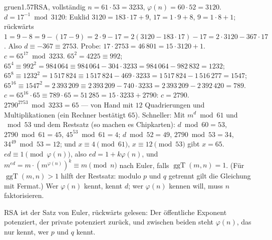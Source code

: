 \begin{loesungkarte}{gruen}{1.57}{RSA, vollständig}
$n = 61\cdot53 = 3233$, $\varphi(n) = 60\cdot52 = 3120$. $d = 17^{-1}\bmod3120$: Euklid $3120 = 183\cdot17 + 9$, $17 = 1\cdot9 + 8$, $9 = 1\cdot8 + 1$; rückwärts $1 = 9 - 8 = 9 - (17 - 9) = 2\cdot9 - 17 = 2(3120 - 183\cdot17) - 17 = 2\cdot3120 - 367\cdot17$. Also $d\equiv-367\equiv2753$. Probe: $17\cdot2753 = 46\,801 = 15\cdot3120 + 1$. \checkmark
{}
$c = 65^{17}\bmod3233$. $65^{2} = 4225\equiv992$; $65^{4}\equiv992^{2} = 984\,064\equiv984\,064 - 304\cdot3233 = 984\,064 - 982\,832 = 1232$; $65^{8}\equiv1232^{2} = 1\,517\,824\equiv1\,517\,824 - 469\cdot3233 = 1\,517\,824 - 1\,516\,277 = 1547$; $65^{16}\equiv1547^{2} = 2\,393\,209\equiv2\,393\,209 - 740\cdot3233 = 2\,393\,209 - 2\,392\,420 = 789$. $c = 65^{16}\cdot65\equiv789\cdot65 = 51\,285 = 15\cdot3233 + 2790$: $c = 2790$.
$2790^{2753}\bmod3233 = 65$ --- von Hand mit $12$ Quadrierungen und Multiplikationen (ein Rechner bestätigt $65$). Schneller: Mit $m^{d}\bmod61$ und $\bmod53$ und dem Restsatz (so machen es Chipkarten): $d\bmod60 = 53$, $2790\bmod61 = 45$, $45^{53}\bmod61 = 4$; $d\bmod52 = 49$, $2790\bmod53 = 34$, $34^{49}\bmod53 = 12$; und $x\equiv4\pmod{61}$, $x\equiv12\pmod{53}$ gibt $x = 65$. \checkmark
{}
$ed\equiv1\pmod{\varphi(n)}$, also $ed = 1 + k\varphi(n)$, und $m^{ed} = m\cdot(m^{\varphi(n)})^{k}\equiv m\pmod n$ nach Euler, falls $\operatorname{ggT}(m, n) = 1$. (Für $\operatorname{ggT}(m, n) > 1$ hilft der Restsatz: modulo $p$ und $q$ getrennt gilt die Gleichung mit Fermat.) Wer $\varphi(n)$ kennt, kennt $d$; wer $\varphi(n)$ kennen will, muss $n$ faktorisieren.
\begin{mitnehmen}\kastentext
RSA ist der Satz von Euler, rückwärts gelesen: Der öffentliche Exponent potenziert, der private potenziert zurück, und zwischen beiden steht $\varphi(n)$, das nur kennt, wer $p$ und $q$ kennt.
\end{mitnehmen}
\end{loesungkarte}

